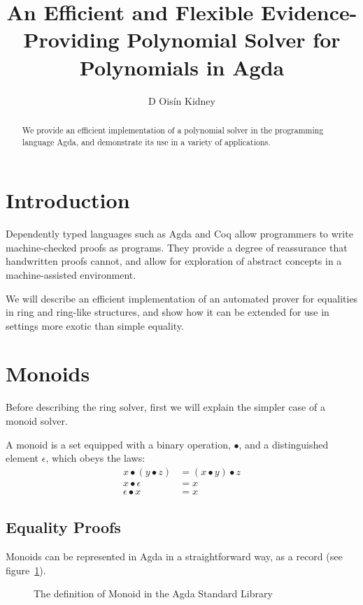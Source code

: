 \documentclass[draft, twocolumn]{article}
\author{D Oisín Kidney}
\title{An Efficient and Flexible Evidence-Providing Polynomial Solver for
  Polynomials in Agda}
\begin{document}
\maketitle
\begin{abstract}
  We provide an efficient implementation of a polynomial solver in the
  programming language Agda, and demonstrate its use in a variety of
  applications.
\end{abstract}
\tableofcontents
\section{Introduction}
Dependently typed languages such as Agda\cite{norell_dependently_2008} and
Coq\cite{the_coq_development_team_2018_1219885} allow programmers to write
machine-checked proofs as programs. They provide a degree of reassurance that
handwritten proofs cannot, and allow for exploration of abstract concepts in a
machine-assisted environment.

We will describe an efficient implementation of an automated prover for
equalities in ring and ring-like structures, and show how it can be extended for
use in settings more exotic than simple equality.
\section{Monoids}
Before describing the ring solver, first we will explain the simpler case of a
monoid solver.

A monoid is a set equipped with a binary operation, \(\bullet\), and a
distinguished element \(\epsilon\), which obeys the laws:
\begin{align}
  x \bullet (y \bullet z) &= (x \bullet y) \bullet z \tag{Associativity} \\
  x \bullet \epsilon      &= x \tag{Left Identity} \\
  \epsilon \bullet x      &= x \tag{Right Identity}
\end{align}
\subsection{Equality Proofs}
Monoids can be represented in Agda in a straightforward way, as a record (see
figure~\ref{mon-def}).
\begin{figure}
  \caption{The definition of Monoid in the Agda Standard
    Library\cite{danielsson_agda_2018}}
  \label{mon-def}
\end{figure}
\end{document}

